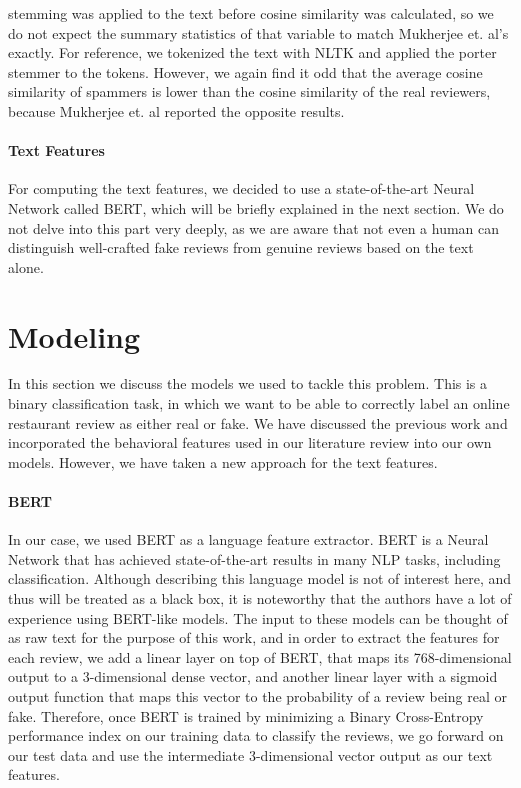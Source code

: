 \documentclass[man, floatsintext, 10pt]{apa6}
\begin{document}
stemming was applied to the text before cosine similarity was calculated, so we do not expect the summary statistics of that variable to match Mukherjee et. al's exactly. For reference, we tokenized the text with NLTK and applied the porter stemmer to the tokens. However, we again find it odd that the average cosine similarity of spammers is lower than the cosine similarity  of the real reviewers, because Mukherjee et. al reported the opposite results.
 \vspace{2mm}
 
\paragraph{Text Features} For computing the text features, we decided to use a state-of-the-art Neural Network called BERT, which will be briefly explained in the next section. We do not delve into this part very deeply, as we are aware that not even a human can distinguish well-crafted fake reviews from genuine reviews based on the text alone.


\section{Modeling}

In this section we discuss the models we used to tackle this problem. This is a binary classification task, in which we want to be able to correctly label an online restaurant review as either real or fake. We have discussed the previous work and incorporated the behavioral features used in our literature review into our own models. However, we have taken a new approach for the text features.

\vspace{2mm}

\paragraph{BERT} In our case, we used BERT as a language feature extractor. BERT is a Neural Network that has achieved state-of-the-art results in many NLP tasks, including classification. Although describing this language model is not of interest here, and thus will be treated as a black box, it is noteworthy that the authors have a lot of experience using BERT-like models. The input to these models can be thought of as raw text for the purpose of this work, and in order to extract the features for each review, we add a linear layer on top of BERT, that maps its 768-dimensional output to a 3-dimensional dense vector, and another linear layer with a sigmoid output function that maps this vector to the probability of a review being real or fake. Therefore, once BERT is trained by minimizing a Binary Cross-Entropy performance index on our training data to classify the reviews, we go forward on our test data and use the intermediate 3-dimensional vector output as our text features. 
\end{document}
